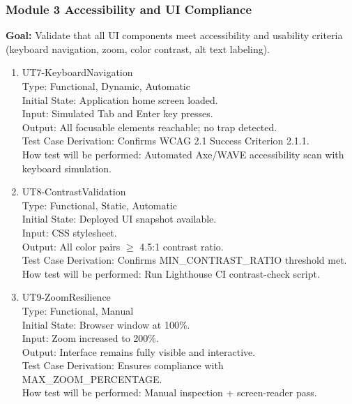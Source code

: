\documentclass[12pt, titlepage]{article}
\begin{document}
\subsubsection{Module 3 \textemdash{} Accessibility and UI Compliance}

\textbf{Goal:} Validate that all UI components meet accessibility and
usability criteria (keyboard navigation, zoom, color contrast, alt
text labeling).

\begin{enumerate}
  \item{UT7-KeyboardNavigation\\}
    Type: Functional, Dynamic, Automatic\\
    Initial State: Application home screen loaded.\\
    Input: Simulated Tab and Enter key presses.\\
    Output: All focusable elements reachable; no trap detected.\\
    Test Case Derivation: Confirms WCAG 2.1 Success Criterion 2.1.1.\\
    How test will be performed: Automated Axe/WAVE accessibility scan
    with keyboard simulation.

  \item{UT8-ContrastValidation\\}
    Type: Functional, Static, Automatic\\
    Initial State: Deployed UI snapshot available.\\
    Input: CSS stylesheet.\\
    Output: All color pairs $\geq$ 4.5:1 contrast ratio.\\
    Test Case Derivation: Confirms MIN\_CONTRAST\_RATIO threshold met.\\
    How test will be performed: Run Lighthouse CI contrast-check script.

  \item{UT9-ZoomResilience\\}
    Type: Functional, Manual\\
    Initial State: Browser window at 100\%.\\
    Input: Zoom increased to 200\%.\\
    Output: Interface remains fully visible and interactive.\\
    Test Case Derivation: Ensures compliance with MAX\_ZOOM\_PERCENTAGE.\\
    How test will be performed: Manual inspection + screen-reader pass.
\end{enumerate}
\end{document}
